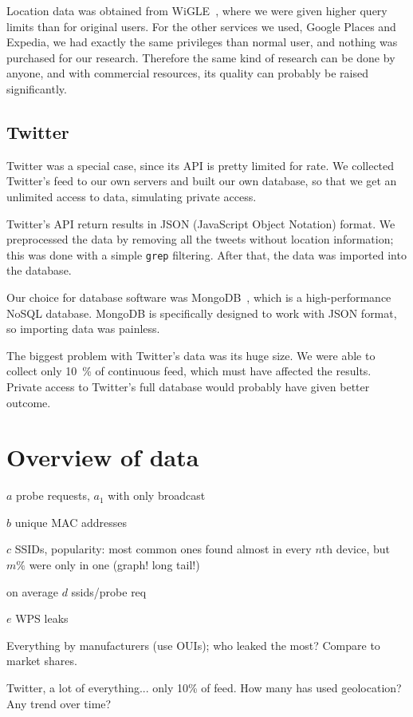 \documentclass[12pt,a4paper,oneside,pdftex]{report}
\begin{document}
Location data was obtained from WiGLE~\cite{wigle}, where we were given higher query limits than for original users. For the other services we used, Google Places and Expedia, we had exactly the same privileges than normal user, and nothing was purchased for our research. Therefore the same kind of research can be done by anyone, and with commercial resources, its quality can probably be raised significantly.

\subsection{Twitter}

Twitter was a special case, since its API is pretty limited for rate. We collected Twitter's feed to our own servers and built our own database, so that we get an unlimited access to data, simulating private access. 

Twitter's API return results in JSON (JavaScript Object Notation) format. We preprocessed the data by removing all the tweets without location information; this was done with a simple \texttt{grep} filtering. After that, the data was imported into the database.

Our choice for database software was MongoDB~\cite{mongodb}, which is a high-performance NoSQL database. MongoDB is specifically designed to work with JSON format, so importing data was painless. 

The biggest problem with Twitter's data was its huge size. We were able to collect only 10~\% of continuous feed, which must have affected the results. Private access to Twitter's full database would probably have given better outcome.

\section{Overview of data}
\label{sec:data_overview}

$a$ probe requests, $a_1$ with only broadcast

$b$ unique MAC addresses

$c$ SSIDs, popularity: most common ones found almost in every $n$th device, but $m \%$ were only in one (graph! long tail!)

on average $d$ ssids/probe req

$e$ WPS leaks

Everything by manufacturers (use OUIs); who leaked the most? Compare to market shares.

Twitter, a lot of everything... only 10\% of feed. How many has used geolocation? Any trend over time?
\end{document}
